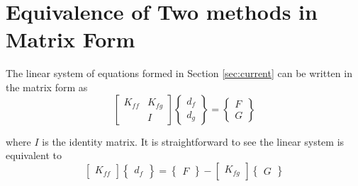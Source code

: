 \documentclass[11pt]{article}  %
\begin{document}
\section{Equivalence of Two methods in Matrix Form} \label{sec:equal}
The linear system of equations formed in Section \ref{sec:current} can be written in the matrix form as
\begin{equation}
 \left[ \begin{array}{cc}
          K_{ff} & K_{fg}\\
                 & I
       \end{array}
  \right]
  \left\lbrace \begin{array}{c}
         d_{f}\\
         d_{g}
      \end{array}
  \right\rbrace
  =
  \left\lbrace \begin{array}{c}
         F\\
         G
      \end{array}
  \right\rbrace
\end{equation}

where $I$ is the identity matrix.
It is straightforward to see the linear system is equivalent to
\begin{equation}
 \left[ \begin{array}{c}
          K_{ff} 
       \end{array}
  \right]
  \left\lbrace \begin{array}{c}
         d_{f}
      \end{array}
  \right\rbrace
  =
  \left\lbrace \begin{array}{c}
         F
      \end{array}
  \right\rbrace - 
   \left[ \begin{array}{c}
          K_{fg} 
       \end{array}
  \right]
  \left\lbrace \begin{array}{c}
         G
      \end{array}
  \right\rbrace
\end{equation}



\end{document}
